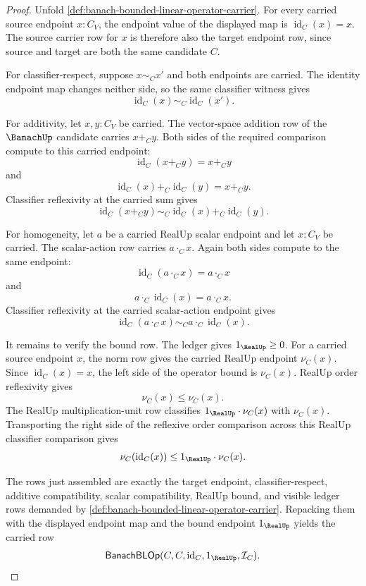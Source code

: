 \begin{proof}
Unfold \autoref{def:banach-bounded-linear-operator-carrier}. For every carried source endpoint $x:C_V$, the endpoint value of the displayed map is $\operatorname{id}_C(x)=x$. The source carrier row for $x$ is therefore also the target endpoint row, since source and target are both the same candidate $C$.

For classifier-respect, suppose $x\sim_C x'$ and both endpoints are carried. The identity endpoint map changes neither side, so the same classifier witness gives
$$
\operatorname{id}_C(x)\sim_C\operatorname{id}_C(x').
$$

For additivity, let $x,y:C_V$ be carried. The vector-space addition row of the $\BanachUp$ candidate carries $x+_C y$. Both sides of the required comparison compute to this carried endpoint:
$$
\operatorname{id}_C(x+_C y)=x+_C y
$$
and
$$
\operatorname{id}_C(x)+_C\operatorname{id}_C(y)=x+_C y.
$$
Classifier reflexivity at the carried sum gives
$$
\operatorname{id}_C(x+_C y)\sim_C\operatorname{id}_C(x)+_C\operatorname{id}_C(y).
$$

For homogeneity, let $a$ be a carried RealUp scalar endpoint and let $x:C_V$ be carried. The scalar-action row carries $a\cdot_C x$. Again both sides compute to the same endpoint:
$$
\operatorname{id}_C(a\cdot_C x)=a\cdot_C x
$$
and
$$
a\cdot_C\operatorname{id}_C(x)=a\cdot_C x.
$$
Classifier reflexivity at the carried scalar-action endpoint gives
$$
\operatorname{id}_C(a\cdot_C x)\sim_C a\cdot_C\operatorname{id}_C(x).
$$

It remains to verify the bound row. The ledger gives $1_{\RealUp}\ge0$. For a carried source endpoint $x$, the norm row gives the carried RealUp endpoint $\nu_C(x)$. Since $\operatorname{id}_C(x)=x$, the left side of the operator bound is $\nu_C(x)$. RealUp order reflexivity gives
$$
\nu_C(x)\le \nu_C(x).
$$
The RealUp multiplication-unit row classifies $1_{\RealUp}\cdot\nu_C(x)$ with $\nu_C(x)$. Transporting the right side of the reflexive order comparison across this RealUp classifier comparison gives
$$
\nu_C(\operatorname{id}_C(x))\le 1_{\RealUp}\cdot\nu_C(x).
$$

The rows just assembled are exactly the target endpoint, classifier-respect, additive compatibility, scalar compatibility, RealUp bound, and visible ledger rows demanded by \autoref{def:banach-bounded-linear-operator-carrier}. Repacking them with the displayed endpoint map and the bound endpoint $1_{\RealUp}$ yields the carried row
$$
\mathsf{BanachBLOp}(C,C,\operatorname{id}_C,1_{\RealUp},\mathcal{I}_C).
$$
\end{proof}

